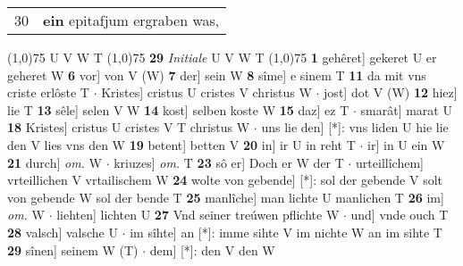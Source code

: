 \documentclass[8pt,a4paper,notitlepage]{article}
\begin{document}
\begin{table}[ht]
\begin{minipage}[t]{0.5\linewidth}
\begin{tabular}{rl}
30 & \textbf{ein} epitafjum ergraben was,\\ 
\end{tabular}
\scriptsize
\line(1,0){75} \newline
U V W T \newline
\line(1,0){75} \newline
\textbf{29} \textit{Initiale} U V W T  \newline
\line(1,0){75} \newline
\textbf{1} gehêret] gekeret U er geheret W \textbf{6} vor] von V (W) \textbf{7} der] sein W \textbf{8} sîme] e sinem T \textbf{11} da mit vns criste erlôste T  $\cdot$ Kristes] cristus U cristes V christus W  $\cdot$ jost] dot V (W) \textbf{12} hiez] lie T \textbf{13} sêle] selen V W \textbf{14} kost] selben koste W \textbf{15} daz] ez T  $\cdot$ smarât] marat U \textbf{18} Kristes] cristus U cristes V T christus W  $\cdot$ uns lie den] [*]: vns liden U hie lie den V lies vns den W \textbf{19} betent] betten V \textbf{20} in] ir U in reht T  $\cdot$ ir] in U ein W \textbf{21} durch] \textit{om.} W  $\cdot$ kriuzes] \textit{om.} T \textbf{23} sô er] Doch er W der T  $\cdot$ urteillîchem] vrteillichen V vrtailischem W \textbf{24} wolte von gebende] [*]: sol der gebende V solt von gebende W sol der bende T \textbf{25} manlîche] man lichte U manlichen T \textbf{26} im] \textit{om.} W  $\cdot$ liehten] lichten U \textbf{27} Vnd seiner treúwen pflichte W  $\cdot$ und] vnde ouch T \textbf{28} valsch] valsche U  $\cdot$ im sîhte] an [*]: imme sihte V im nichte W an im sihte T \textbf{29} sînen] seinem W (T)  $\cdot$ dem] [*]: den V den W \newline
\end{minipage}
\end{table}
\end{document}
